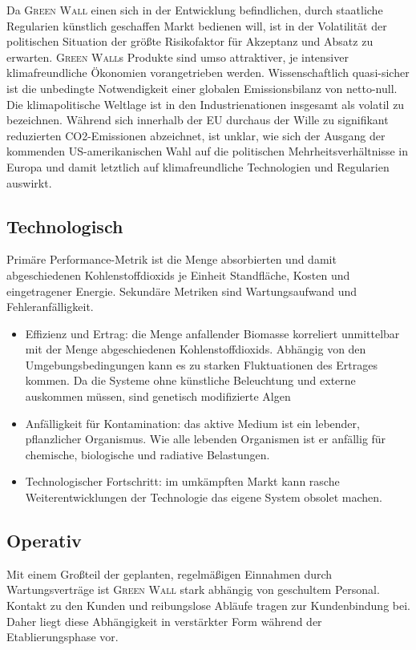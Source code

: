 Da \textsc{Green Wall} einen sich in der Entwicklung befindlichen, durch staatliche Regularien künstlich geschaffen Markt bedienen will, ist in der Volatilität der politischen Situation der größte Risikofaktor für Akzeptanz und Absatz zu erwarten.
\textsc{Green Wall}s Produkte sind umso attraktiver, je intensiver klimafreundliche Ökonomien vorangetrieben werden.
Wissenschaftlich quasi-sicher ist die unbedingte Notwendigkeit einer globalen Emissionsbilanz von netto-null.
Die klimapolitische Weltlage ist in den Industrienationen insgesamt als volatil zu bezeichnen.
Während sich innerhalb der EU durchaus der Wille zu signifikant reduzierten CO2-Emissionen abzeichnet, ist unklar, wie sich der Ausgang der kommenden US-amerikanischen Wahl auf die politischen Mehrheitsverhältnisse in Europa und damit letztlich auf klimafreundliche Technologien und Regularien auswirkt.

\subsection{Technologisch}

Primäre Performance-Metrik ist die Menge absorbierten und damit abgeschiedenen Kohlenstoffdioxids je Einheit Standfläche, Kosten und eingetragener Energie.
Sekundäre Metriken sind Wartungsaufwand und Fehleranfälligkeit.
\begin{itemize}
    \item Effizienz und Ertrag: die Menge anfallender Biomasse korreliert unmittelbar mit der Menge abgeschiedenen Kohlenstoffdioxids.
          Abhängig von den Umgebungsbedingungen kann es zu starken Fluktuationen des Ertrages kommen.
          Da die Systeme ohne künstliche Beleuchtung und externe  auskommen müssen, sind genetisch modifizierte Algen
    \item Anfälligkeit für Kontamination: das aktive Medium ist ein lebender, pflanzlicher Organismus. Wie alle lebenden Organismen ist er anfällig für chemische, biologische und radiative Belastungen.
    \item Technologischer Fortschritt: im umkämpften Markt kann rasche Weiterentwicklungen der Technologie das eigene System obsolet machen.
\end{itemize}

\subsection{Operativ}

Mit einem Großteil der geplanten, regelmäßigen Einnahmen durch Wartungsverträge ist \textsc{Green Wall} stark abhängig von geschultem Personal.
Kontakt zu den Kunden und reibungslose Abläufe tragen zur Kundenbindung bei.
Daher liegt diese Abhängigkeit in verstärkter Form während der Etablierungsphase vor.\par


